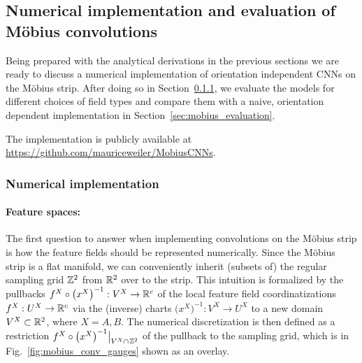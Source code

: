 \subsection{Numerical implementation and evaluation of M\"obius convolutions}
\label{sec:mobius_experiment_main}

Being prepared with the analytical derivations in the previous sections we are ready to discuss a numerical implementation of orientation independent CNNs on the M\"obius strip.
After doing so in Section~\ref{sec:mobius_implementation}, we evaluate the models for different choices of field types and compare them with a naive, orientation dependent implementation in Section~\ref{sec:mobius_evaluation}.

The implementation is publicly available at \url{https://github.com/mauriceweiler/MobiusCNNs}.



\subsubsection{Numerical implementation}
\label{sec:mobius_implementation}

\paragraph{Feature spaces:}
The first question to answer when implementing convolutions on the M\"obius strip is how the feature fields should be represented numerically.
Since the M\"obius strip is a flat manifold, we can conveniently inherit (subsets of) the regular sampling grid $\mathbb{Z}^2$ from $\mathbb{R}^2$ over to the strip.
This intuition is formalized by the pullbacks
$f^X\circ \big(x^X\big)^{-1}: V^X \to \mathbb{R}^c$
of the local feature field coordinatizations
$f^X: U^X \to \mathbb{R}^c$
via the (inverse) charts
$\big(x^X\big)^{-1}: V^X \to U^X$
to a new domain $V^X \subset \mathbb{R}^2$,
where $X=A,B$.
The numerical discretization is then defined as a restriction
$f^X\circ \big(x^X\big)^{-1} \big|_{V^X\cap\mkern2mu\mathbb{Z}^2}$
of the pullback to the sampling grid, which is in Fig.~\ref{fig:mobius_conv_gauges} shown as an overlay.


